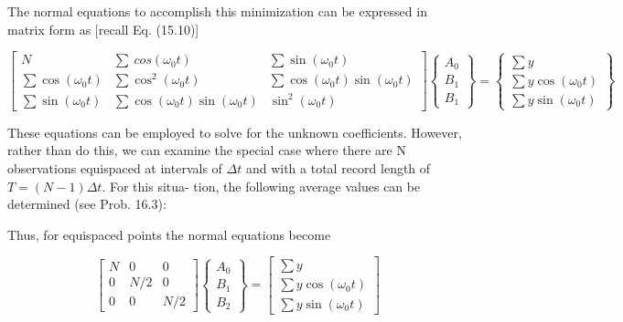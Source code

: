 \documentclass[../main.tex]{subfiles}
\begin{document}
\noindent The normal equations to accomplish this minimization can be expressed in matrix form as [recall Eq. (15.10)]

\begin{equation}
	\tag{16.12}
	\begin{bmatrix}
		N & \sum \ cos(\omega_0 t) & \sum \sin(\omega_0 t) \\
		\sum \cos(\omega_0 t) & \sum \cos^2 (\omega_0 t) & \sum \cos (\omega_0 t) \sin (\omega_0 t) \\
		\sum \sin(\omega_0 t) & \sum \cos (\omega_0 t) \sin (\omega_0 t) & \sin^2 (\omega_0 t)
	\end{bmatrix}
	\begin{Bmatrix}
		A_0 \\ B_1 \\ B_1
	\end{Bmatrix}
	=
	\begin{Bmatrix}
		\sum y \\ \sum y \cos(\omega_0 t) \\ \sum y \sin(\omega_0 t)
	\end{Bmatrix}
\end{equation}

These equations can be employed to solve for the unknown coefficients. However,
rather than do this, we can examine the special case where there are N observations equispaced at intervals of $\Delta t$ and with a total record length of $T = (N - 1)\Delta t$. For this situa-
tion, the following average values can be determined (see Prob. 16.3):


\noindent Thus, for equispaced points the normal equations become

\begin{equation}
	\begin{bmatrix}
		N & 0 & 0 \\
		0 & N/2 & 0 \\
		0 & 0 & N/2
	\end{bmatrix}
	\begin{Bmatrix}
		A_0 \\ B_1 \\ B_2
	\end{Bmatrix}
	=
	\begin{bmatrix}
		\sum y \\
		\sum y \cos(\omega_0 t) \\
		\sum y \sin(\omega_0 t)
	\end{bmatrix}
\end{equation}
\end{document}
